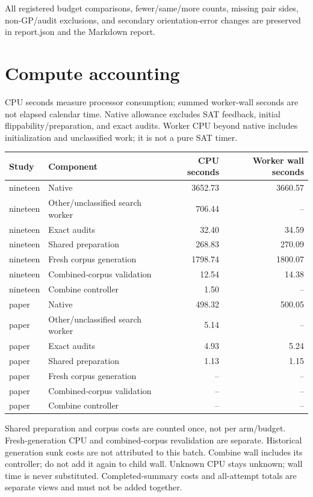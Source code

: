 \documentclass[10pt,a4paper]{article}
\begin{document}
All registered budget comparisons, fewer/same/more counts, missing pair sides, non-GP/audit exclusions, and secondary orientation-error changes are preserved in report.json and the Markdown report.

\clearpage

\section*{Compute accounting}

CPU seconds measure processor consumption; summed worker-wall seconds are not elapsed calendar time. Native allowance excludes SAT feedback, initial flippability/preparation, and exact audits. Worker CPU beyond native includes initialization and unclassified work; it is not a pure SAT timer.

\begin{center}\small\begin{longtable}{llrr}
\toprule
Study & Component & CPU seconds & Worker wall seconds \\
\midrule\endhead
nineteen & Native & 3652.73 & 3660.57 \\
nineteen & Other/unclassified search worker & 706.44 & -- \\
nineteen & Exact audits & 32.40 & 34.59 \\
nineteen & Shared preparation & 268.83 & 270.09 \\
nineteen & Fresh corpus generation & 1798.74 & 1800.07 \\
nineteen & Combined-corpus validation & 12.54 & 14.38 \\
nineteen & Combine controller & 1.50 & -- \\
paper & Native & 498.32 & 500.05 \\
paper & Other/unclassified search worker & 5.14 & -- \\
paper & Exact audits & 4.93 & 5.24 \\
paper & Shared preparation & 1.13 & 1.15 \\
paper & Fresh corpus generation & -- & -- \\
paper & Combined-corpus validation & -- & -- \\
paper & Combine controller & -- & -- \\
\bottomrule\end{longtable}\end{center}


Shared preparation and corpus costs are counted once, not per arm/budget. Fresh-generation CPU and combined-corpus revalidation are separate. Historical generation sunk costs are not attributed to this batch. Combine wall includes its controller; do not add it again to child wall. Unknown CPU stays unknown; wall time is never substituted. Completed-summary costs and all-attempt totals are separate views and must not be added together.
\end{document}
